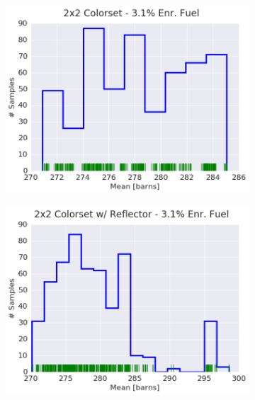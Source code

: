 \begin{figure}[h!]
\begin{subfigure}{0.5\textwidth}
  \centering
  \includegraphics[width=\linewidth]{figures/patterns/2x2/hist-kde-rug/31-enr-fiss-2}
  \caption{}
  \label{fig:chap9-hist-2x2-3.1-fiss}
\end{subfigure}%
\begin{subfigure}{0.5\textwidth}
  \centering
  \includegraphics[width=\linewidth]{figures/patterns/reflector/hist-kde-rug/31-enr-fiss-2}  \caption{}
  \label{fig:chap9-hist-reflector-3.1-fiss}
\end{subfigure}
\begin{subfigure}{0.5\textwidth}
  \centering

\end{subfigure}
\end{figure}
